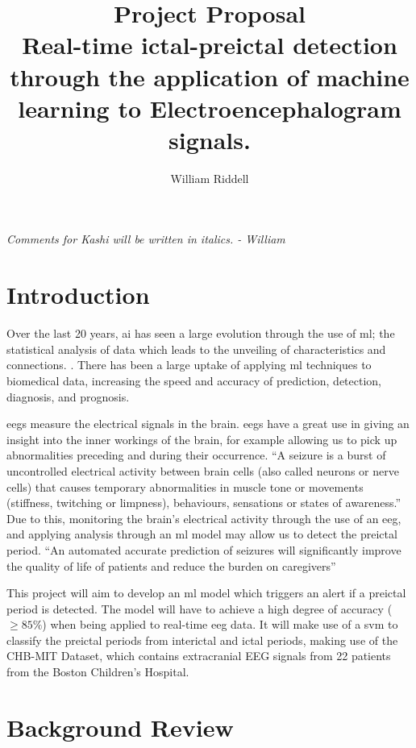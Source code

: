 \documentclass[12pt]{article}
\title{Project Proposal \\ Real-time ictal-preictal detection through the application of machine learning to Electroencephalogram signals.}
\author{William Riddell}
\begin{document}
\maketitle

\textit{Comments for Kashi will be written in italics. - William}

\section{Introduction}

Over the last 20 years, \acrfull{ai} has seen a large evolution through the use of \acrfull{ml}; the statistical analysis of data which leads to the unveiling of characteristics and connections. \cite{awad2015efficient}. There has been a large uptake of applying \acrshort{ml} techniques to biomedical data, increasing the speed and accuracy of prediction, detection, diagnosis, and prognosis. 

\acrfull{eegs} measure the electrical signals in the brain. \acrshort{eegs} have a great use in giving an insight into the inner workings of the brain, for example allowing us to pick up abnormalities preceding and during their occurrence. ``A seizure is a burst of uncontrolled electrical activity between brain cells (also called neurons or nerve cells) that causes temporary abnormalities in muscle tone or movements (stiffness, twitching or limpness), behaviours, sensations or states of awareness.'' \cite{johnHopkinsTypesOfSeizures} Due to this, monitoring the brain's electrical activity through the use of an \acrshort{eeg}, and applying analysis through an \acrshort{ml} model may allow us to detect the preictal period. ``An automated accurate prediction of seizures will significantly improve the quality of life of patients and reduce the burden on caregivers'' \cite{acharya2018automated}

This project will aim to develop an \acrshort{ml} model which triggers an alert if a preictal period is detected. The model will have to achieve a high degree of accuracy ($\geq85\%$) when being applied to real-time \acrshort{eeg} data. It will make use of a \acrfull{svm} to classify the preictal periods from interictal and ictal periods, making use of the CHB-MIT Dataset, which contains extracranial EEG signals from 22 patients from the Boston Children's Hospital. \cite{shoeb2009application} \cite{PhysioNet}


\section{Background Review}
\end{document}
